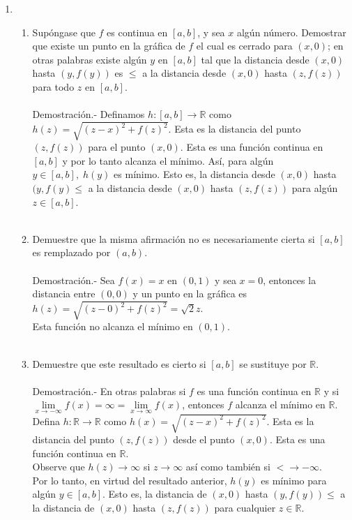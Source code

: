 \begin{enumerate}[\bfseries 1.]
\item 
    \begin{enumerate}[\bfseries (a)]

	\item Supóngase que $f$ es continua en $[a,b]$, y sea $x$ algún número. Demostrar que existe un punto en la gráfica de $f$ el cual es cerrado para $(x,0)$; en otras palabras existe algún $y$ en $[a,b]$ tal que la distancia desde $(x,0)$ hasta $(y,f(y))$ es $\leq$ a la distancia desde $(x,0)$ hasta $(z,f(z))$ para todo $z$ en $[a,b]$.\\\\
	    Demostración.-\; Definamos $h :  {[a,b]\to \mathbb{R}}$ como $h(z)=\sqrt{(z-x)^2+f(z)^2}$. Esta es la distancia del punto $(z,f(z))$ para el punto $(x,0)$. Esta es una función continua en $[a,b]$ y por lo tanto alcanza el mínimo. Así, para algún $y \in [a,b],\; h(y)$ es mínimo. Esto es, la distancia desde $(x,0)$ hasta $(y,f(y)\leq$ a la distancia desde $(x,0)$ hasta $(z,f(z))$ para algún $z\in [a,b]$.\\\\

	\item Demuestre que la misma afirmación no es necesariamente cierta si $[a,b]$ es remplazado por $(a,b)$.\\\\
	    Demostración.-\; Sea $f(x)=x$ en $(0,1)$ y sea $x=0$, entonces la distancia entre $(0,0)$ y un punto en la gráfica es $h(z)=\sqrt{(z-0)^2+f(z)^2}=\sqrt{2}z$.\\
	    Esta función no alcanza el mínimo en $(0,1).$\\\\

	\item Demuestre que este resultado es cierto si $[a,b]$ se sustituye por $\mathbb{R}$.\\\\
	    Demostración.-\; En otras palabras si $f$ es una función continua en $\mathbb{R}$ y si $\lim\limits_{x\to -\infty} f(x)=\infty = \lim\limits_{x\to \infty} f(x)$, entonces $f$ alcanza el mínimo en $\mathbb{R}$.\\
	    Defina $h: {\mathbb{R} \to \mathbb{R}}$ como $h(x)=\sqrt{(z-x)^2+f(z)^2}$. Esta es la distancia del punto $(z,f(z))$ desde el punto $(x,0)$. Esta es una función continua en $\mathbb{R}.$\\
	    Observe que ${h(z)\to \infty}$ si ${z\to \infty}$ así como también si ${<\to -\infty}$.\\
	    Por lo tanto, en virtud del resultado anterior, $h(y)$ es mínimo para algún $y\in [a,b]$. Esto es, la distancia de $(x,0)$ hasta $(y,f(y)) \leq$ a la distancia de $(x,0)$ hasta $(z,f(z))$ para cualquier $z\in \mathbb{R}$.\\\\


\end{enumerate}
\end{enumerate}

